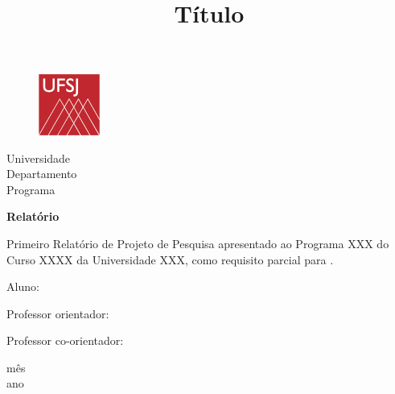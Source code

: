 \documentclass[a4paper,12pt]{article}
\begin{document}
\begin{titlepage}
	\begin{center}
	
    \begin{figure}[!ht]
    \centering
    \includegraphics[width=2cm]{UFSJ_logo.png}
    \end{figure}

		\Huge{Universidade}\\
		\large{Departamento}\\ 
		\large{Programa}\\ 
        \vspace{15pt}
        
        \vspace{85pt}
        
		\textbf{\LARGE{Relatório}}
		\title{\large{Título}}
			
	\end{center}
\vspace{1,5cm}
	
	\begin{flushright}

    \begin{list}{}{
      \setlength{\leftmargin}{4.5cm}
      \setlength{\rightmargin}{0cm}
      \setlength{\labelwidth}{0pt}
      \setlength{\labelsep}{\leftmargin}}

      \item Primeiro Relatório de Projeto de Pesquisa apresentado ao Programa XXX do Curso XXXX da Universidade XXX, como requisito parcial para .

      \begin{list}{}{
      \setlength{\leftmargin}{0cm}
      \setlength{\rightmargin}{0cm}
      \setlength{\labelwidth}{0pt}
      \setlength{\labelsep}{\leftmargin}}

			\item Aluno: \
            \item Professor orientador: \
      		\item Professor co-orientador: \

      \end{list}
   \end{list}
\end{flushright}
\vspace{1cm}
\begin{center}
		\vspace{\fill}
		 mês\\
		 ano
			\end{center}
\end{titlepage}
\newpage
\newpage
\tableofcontents
\thispagestyle{empty}
\end{document}
